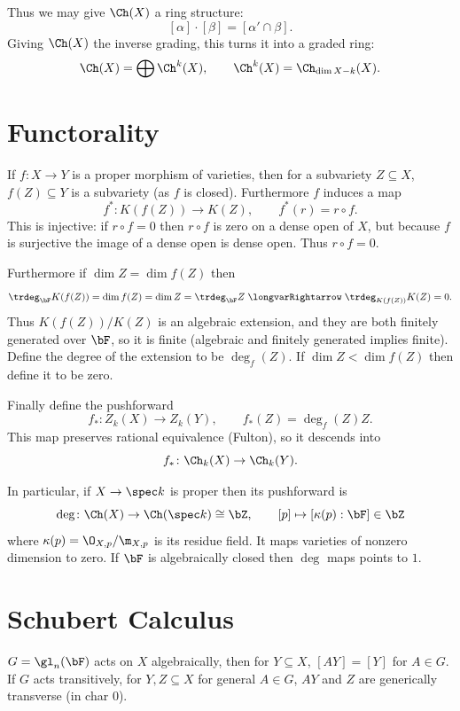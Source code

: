 \ethrm

Thus we may give $\Ch(X)$ a ring structure:
$$ [\alpha]\cdot[\beta] = [\alpha'\cap\beta] . $$
Giving $\Ch(X)$ the inverse grading, this turns it into a graded ring:
$$ \Ch(X) = \bigoplus\Ch^k(X),\qquad \Ch^k(X) = \Ch_{\dim X-k}(X) . $$

\section{Functorality}

If $f\colon X\to Y$ is a proper morphism of varieties, then for a subvariety $Z\subseteq X$, $f(Z)\subseteq Y$ is a subvariety (as $f$ is closed).
Furthermore $f$ induces a map
$$ f^*\colon K(f(Z)) \to K(Z),\qquad f^*(r) = r\circ f . $$
This is injective: if $r\circ f=0$ then $r\circ f$ is zero on a dense open of $X$, but because $f$ is surjective the image of a dense open is dense open.
Thus $r\circ f=0$.

Furthermore if $\dim Z=\dim f(Z)$ then
$$ \trdeg_\bF K(f(Z)) = \dim f(Z) = \dim Z = \trdeg_\bF Z \implies \trdeg_{K(f(Z))}K(Z) = 0 . $$
Thus $K(f(Z))/K(Z)$ is an algebraic extension, and they are both finitely generated over $\bF$, so it is finite (algebraic and finitely generated implies finite).
Define the degree of the extension to be $\deg_f(Z)$.
If $\dim Z<\dim f(Z)$ then define it to be zero.

Finally define the {\emphcolor pushforward}
$$ f_*\colon Z_k(X) \to Z_k(Y),\qquad f_*(Z) = \deg_f(Z)Z . $$
This map preserves rational equivalence (Fulton), so it descends into
$$ f_*\colon\Ch_k(X) \to \Ch_k(Y) . $$

In particular, if $X\to\spec k$ is proper then its pushforward is
$$ \deg\colon \Ch(X) \to \Ch(\spec k) \cong \bZ,\qquad [p]\mapsto[\kappa(p):\bF] \in \bZ $$
where $\kappa(p)=\O_{X,p}/\m_{X,p}$ is its residue field.
It maps varieties of nonzero dimension to zero.
If $\bF$ is algebraically closed then $\deg$ maps points to $1$.

\section{Schubert Calculus}

\bthrm[title={Kleiman, special case}]

    $G=\gl_n(\bF)$ acts on $X$ algebraically, then for $Y\subseteq X$, $[AY]=[Y]$ for $A\in G$.
    If $G$ acts transitively, for $Y,Z\subseteq X$ for general $A\in G$, $AY$ and $Z$ are generically transverse (in char $0$).

